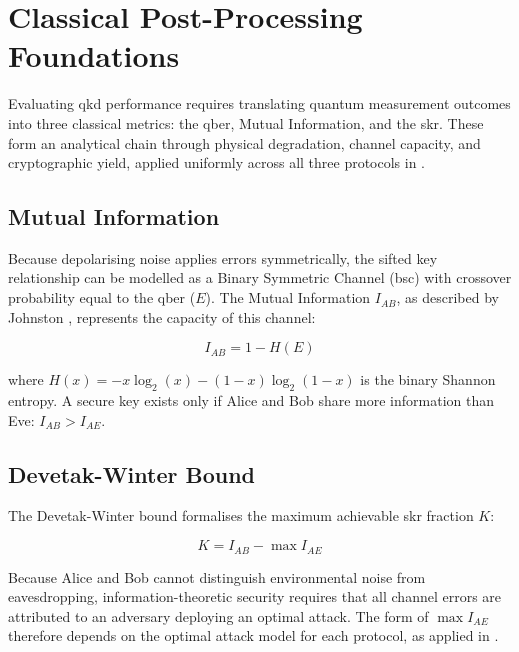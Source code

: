 \documentclass[11pt, a4paper]{report}
\begin{document}
\section{Classical Post-Processing Foundations}
\label{sec:postfoundations}

Evaluating \gls{qkd} performance requires translating quantum measurement outcomes into three classical metrics: the \gls{qber}, Mutual Information, and the \gls{skr}. These form an analytical chain through physical degradation, channel capacity, and cryptographic yield, applied uniformly across all three protocols in .


\subsection{Mutual Information}
\label{subsec:mutualinfobg}

Because depolarising noise applies errors symmetrically, the sifted key relationship can be modelled as a Binary Symmetric Channel (\gls{bsc}) with crossover probability equal to the \gls{qber} ($E$). The Mutual Information $I_{AB}$, as described by Johnston \cite{mutualInfo}, represents the capacity of this channel:

\begin{equation}
    I_{AB} = 1 - H(E)
    \label{eq:mi_theory}
\end{equation}

where $H(x) = -x\log_2(x) - (1-x)\log_2(1-x)$ is the binary Shannon entropy. A secure key exists only if Alice and Bob share more information than Eve: $I_{AB} > I_{AE}$.

\subsection{Devetak-Winter Bound}
\label{subsec:dwboundbg}

The Devetak-Winter bound \cite{DWbound2005} formalises the maximum achievable \gls{skr} fraction $K$:

\begin{equation}
    K = I_{AB} - \max I_{AE}
    \label{eq:dw_theory}
\end{equation}

Because Alice and Bob cannot distinguish environmental noise from eavesdropping, information-theoretic security requires that all channel errors are attributed to an adversary deploying an optimal attack. The form of $\max I_{AE}$ therefore depends on the optimal attack model for each protocol, as applied in .
\end{document}
